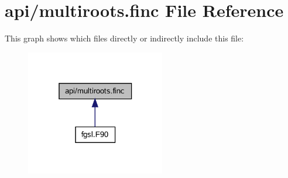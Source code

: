 \hypertarget{multiroots_8finc}{}\section{api/multiroots.finc File Reference}
\label{multiroots_8finc}
This graph shows which files directly or indirectly include this file\+:\nopagebreak
\begin{figure}[H]
\begin{center}
\leavevmode
\includegraphics[width=172pt]{multiroots_8finc__dep__incl}
\end{center}
\end{figure}
